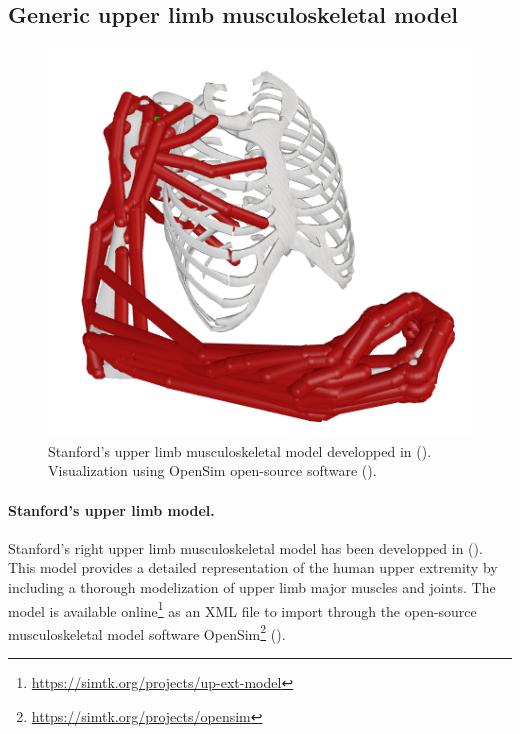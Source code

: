 \subsection{Generic upper limb musculoskeletal model}
\label{subsec:generic_msk}
\begin{figure}[!htb]
    \centering
    \captionsetup{justification=centering}
    \begin{minipage}{1\linewidth}
        \captionsetup{justification=centering}
        \centering
        \includegraphics[trim={20 0 20 0}, clip, width=0.2\linewidth]{img/chapter_4/full_stanford.png}
    \end{minipage}
    \caption{Stanford's upper limb musculoskeletal model developped in (\cite{holzbaurModelUpperExtremity2005}). Visualization using OpenSim open-source software (\cite{delpOpenSimOpenSourceSoftware2007}).}
    \label{fig:stanford_full}
\end{figure}
\paragraph*{Stanford's upper limb model.} Stanford's right upper limb musculoskeletal model has been developped in (\cite{holzbaurModelUpperExtremity2005}). This model provides a detailed representation of the human upper extremity by including a thorough modelization of upper limb major muscles and joints.  The model is available online\footnote{\url{https://simtk.org/projects/up-ext-model}} as an XML file to import through the open-source musculoskeletal model software OpenSim\footnote{\url{https://simtk.org/projects/opensim}} (\cite{delpOpenSimOpenSourceSoftware2007}).

